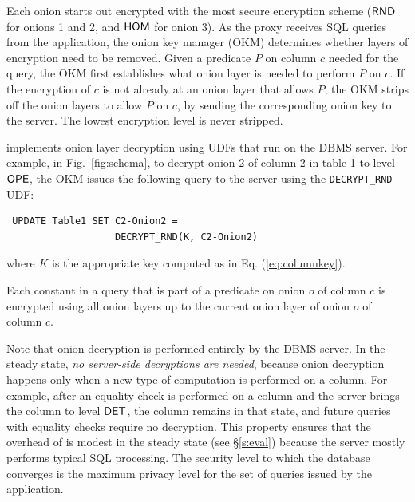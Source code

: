 Each onion starts out encrypted with the most secure encryption scheme
($\mathsf{RND}$ for onions 1 and 2, and $\mathsf{HOM}$ for onion 3)\@.  As the proxy
receives SQL queries from the application, the onion key manager (OKM)
determines whether layers of encryption need to be removed.  Given a
predicate $P$ on column $c$ needed for the query, the OKM first
establishes what onion layer is needed to perform $P$ on $c$.  If the
encryption of $c$ is not already at an onion layer that allows $P$,
the OKM strips off the onion layers to allow $P$ on $c$, by sending
the corresponding onion key to the server. The lowest encryption level is never stripped.

\name{} implements onion layer decryption using UDFs that run on the
DBMS server.  For example, in Fig.~\ref{fig:schema}, to decrypt onion 2 of column 2 in table 1 
to level $\mathsf{OPE}$, the OKM issues the following query to the server
using the {\tt DECRYPT\_RND} UDF:

\begin{verbatim}
 UPDATE Table1 SET C2-Onion2 =
                   DECRYPT_RND(K, C2-Onion2)
\end{verbatim}
where $K$ is the appropriate key computed as in Eq.
(\ref{eq:columnkey}).

Each constant in a query that is part of a predicate on onion $o$ of column $c$ is encrypted using all onion layers up to the current onion layer of onion $o$ of column $c$. 

Note that onion decryption is performed entirely by the DBMS server.
In the steady state, {\em no server-side decryptions are needed},
because onion decryption happens only when a new type of computation
is performed on a column.  For example, after an equality check is performed
on a column and the server brings the column to level $\mathsf{DET}$, the
column remains in that state, and future queries with equality checks require no decryption.  This property ensures that the
overhead of \name{} is modest in the steady state (see \S\ref{s:eval}) because the server mostly performs typical SQL processing.
The security level to which the database converges is the maximum
privacy level for the set of queries issued by the application.

